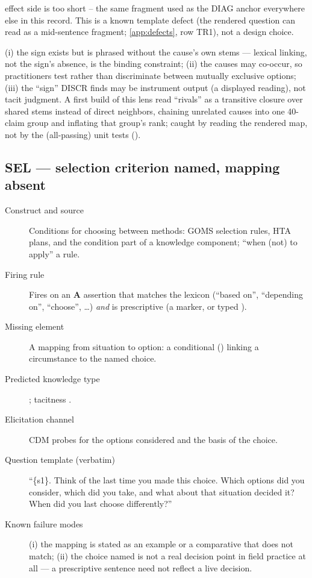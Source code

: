 \begin{description}
    effect side is too short -- the same fragment used as the DIAG anchor everywhere else in this
    record. This is a known template defect (the rendered question can read as a mid-sentence
    fragment; \cref{app:defects}, row TR1), not a design choice.
  \item[Known failure modes] (i) the sign exists but is phrased without the cause's own stems ---
    lexical linking, not the sign's absence, is the binding constraint; (ii) the causes may
    co-occur, so practitioners test rather than discriminate between mutually exclusive options;
    (iii) the \enquote{sign} DISCR finds may be instrument output (a displayed reading), not tacit
    judgment. A first build of this lens read \enquote{rivals} as a transitive closure over shared
    stems instead of direct neighbors, chaining unrelated causes into one 40-claim group and
    inflating that group's rank; caught by reading the rendered map, not by the (all-passing) unit
    tests ().
\end{description}

\subsection{SEL --- selection criterion named, mapping absent}

\begin{description}
  \item[Construct and source] Conditions for choosing between methods: GOMS selection rules, HTA
    plans, and the condition part of a knowledge component; \enquote{when (not) to apply} a rule.
  \item[Firing rule] Fires on an \textbf{A} assertion that matches the  lexicon
    (\enquote{based on}, \enquote{depending on}, \enquote{choose}, \ldots) \emph{and} is
    prescriptive (a  marker, or typed ).
  \item[Missing element] A mapping from situation to option: a conditional () linking a
    circumstance to the named choice.
  \item[Predicted knowledge type] ; tacitness .
  \item[Elicitation channel] CDM probes for the options considered and the basis of the choice.
  \item[Question template (verbatim)] \enquote{\textquotedbl\{s1\}\textquotedbl. Think of the last
    time you made this choice. Which options did you consider, which did you take, and what about
    that situation decided it? When did you last choose differently?}
  \item[Known failure modes] (i) the mapping is stated as an example or a comparative that
     does not match; (ii) the choice named is not a real decision point in field
    practice at all --- a prescriptive sentence need not reflect a live decision.
\end{description}

